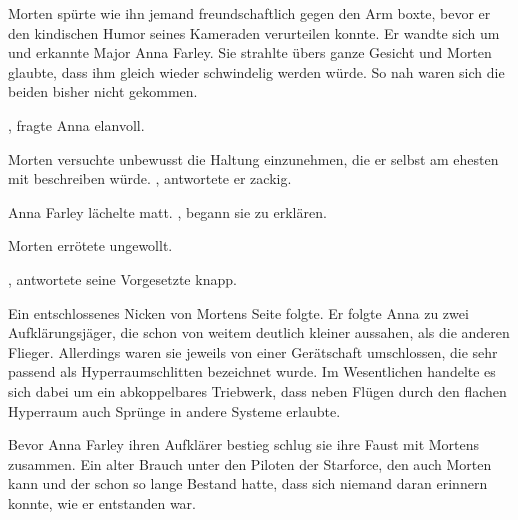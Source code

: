 \par

Morten spürte wie ihn jemand freundschaftlich gegen den Arm boxte, bevor er den kindischen Humor seines Kameraden verurteilen konnte. Er wandte sich um und erkannte Major Anna Farley. Sie strahlte übers ganze Gesicht und Morten glaubte, dass ihm gleich wieder schwindelig werden würde. So nah waren sich die beiden bisher nicht gekommen.

\par

, fragte Anna elanvoll.

\par

Morten versuchte unbewusst die Haltung einzunehmen, die er selbst am ehesten mit  beschreiben würde. , antwortete er zackig.

\par

Anna Farley lächelte matt. , begann sie zu erklären. 

\par

Morten errötete ungewollt. 

\par

, antwortete seine Vorgesetzte knapp. 

\par

Ein entschlossenes Nicken von Mortens Seite folgte. Er folgte Anna zu zwei Aufklärungsjäger, die schon von weitem deutlich kleiner aussahen, als die anderen Flieger. Allerdings waren sie jeweils von einer Gerätschaft umschlossen, die sehr passend als Hyperraumschlitten bezeichnet wurde. Im Wesentlichen handelte es sich dabei um ein abkoppelbares Triebwerk, dass neben Flügen durch den flachen Hyperraum auch Sprünge in andere Systeme erlaubte.

\par

Bevor Anna Farley ihren Aufklärer bestieg schlug sie ihre Faust mit Mortens zusammen. Ein alter Brauch unter den Piloten der Starforce, den auch Morten kann und der schon so lange Bestand hatte, dass sich niemand daran erinnern konnte, wie er entstanden war.

